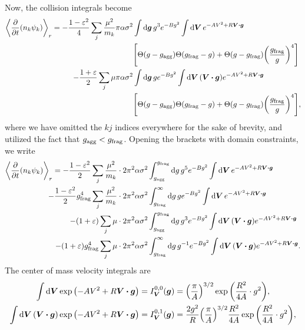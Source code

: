 \documentclass[aps,prl,preprint,groupedaddress,10pt]{revtex4-2}
\begin{document}
Now, the collision integrals become
\begin{equation}
    \begin{split}
        \avg{\pdv{t}(n_k\psi_k)}_r=-\frac{1-\eps^2}{4}\sum_{j}\frac{\mu^2}{m_k}
        \pi\alpha\sigma^2&\int
        \dd{\bg}g^{3}e^{-Bg^2}
        \int\dd{\bV}e^{-AV^2+R\bV\vdot\bg}\\
        &\bqty{\Theta(g-\ltx{g}{agg})\Theta\pqty{\ltx{g}{frag}-g}+
            \Theta\pqty{g-\ltx{g}{frag}}\pqty{\frac{\ltx{g}{frag}}{g}}^4}\\
        -\frac{1+\eps}{2}\sum_{j}\mu\pi\alpha\sigma^2&\int
        \dd{\bg}g e^{-Bg^2}\int\dd{\bV}\pqty{\bV\vdot\bg}
        e^{-AV^2+R\bV\vdot\bg}\\
        &\bqty{\Theta(g-\ltx{g}{agg})\Theta\pqty{\ltx{g}{frag}-g}+
            \Theta\pqty{g-\ltx{g}{frag}}\pqty{\frac{\ltx{g}{frag}}{g}}^4},
    \end{split}
\end{equation}
where we have omitted the $kj$ indices everywhere for the sake of brevity, and
utilized the fact that $g_{\mathrm{agg}}<g_{\mathrm{frag}}$. Opening the
brackets with domain constraints, we write
\begin{equation}
    \begin{split}
        \avg{\pdv{t}(n_k\psi_k)}_r=-\frac{1-\eps^2}{2}\sum_{j}\frac{\mu^2}{m_k}\cdot
        2\pi^2\alpha\sigma^2&\int_{\ltx{g}{agg}}^{\ltx{g}{frag}}
        \dd{g}g^{5}e^{-Bg^2}
        \int\dd{\bV}e^{-AV^2+R\bV\vdot\bg}\\
        -\frac{1-\eps^2}{2}\ltx{g}{frag}^4\sum_{j}\frac{\mu^2}{m_k}\cdot
        2\pi^2\alpha\sigma^2&\int_{\ltx{g}{frag}}^{\infty}
        \dd{g}ge^{-Bg^2}\int\dd{\bV}e^{-AV^2+R\bV\vdot\bg}\\
        -\pqty{1+\eps}\sum_{j}\mu\cdot 2\pi^2\alpha\sigma^2
        &\int_{\ltx{g}{agg}}^{\ltx{g}{frag}}
        \dd{g}g^3 e^{-Bg^2}\int\dd{\bV}\pqty{\bV\vdot\bg}
        e^{-AV^2+R\bV\vdot\bg}\\
        -\pqty{1+\eps}\ltx{g}{frag}^4\sum_{j}\mu\cdot 2\pi^2\alpha\sigma^2
        &\int_{\ltx{g}{frag}}^{\infty}
        \dd{g}g^{-1} e^{-Bg^2}\int\dd{\bV}\pqty{\bV\vdot\bg}
        e^{-AV^2+R\bV\vdot\bg}.
    \end{split}
\end{equation}
The center of mass velocity integrals are
\begin{equation}
    \begin{split}
        \int\dd{\bV}\exp\pqty{-AV^2+R\bV\vdot\bg}&=I_{\bV}^{0,0}(\bg)=
        \pqty{\frac{\pi}{A}}^{3/2}\exp\pqty{\frac{R^2}{4A}\cdot g^2},\\
        \int\dd{\bV}\pqty{\bV\vdot\bg}\exp\pqty{-AV^2+R\bV\vdot\bg}&=I_{\bV}^{0,1}(\bg)=
        \frac{2g^2}{R}\pqty{\frac{\pi}{A}}^{3/2}\frac{R^2}{4A}
        \exp\pqty{\frac{R^2}{4A}\cdot g^2},
    \end{split}
\end{equation}
\end{document}
